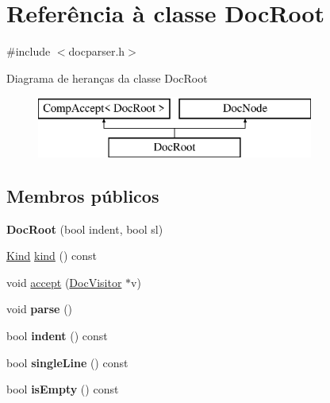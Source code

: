 \hypertarget{class_doc_root}{\section{Referência à classe Doc\-Root}
\label{class_doc_root}
}


{\ttfamily \#include $<$docparser.\-h$>$}

Diagrama de heranças da classe Doc\-Root\begin{figure}[H]
\begin{center}
\leavevmode
\includegraphics[height=2.000000cm]{class_doc_root}
\end{center}
\end{figure}
\subsection*{Membros públicos}
\begin{DoxyCompactItemize}
\item 
\hypertarget{class_doc_root_a8f85d5fa2b23cfee46deddde18a637c7}{{\bfseries Doc\-Root} (bool indent, bool sl)}\label{class_doc_root_a8f85d5fa2b23cfee46deddde18a637c7}

\item 
\hyperlink{class_doc_node_aa10c9e8951b8ccf714a59ec321bdac5b}{Kind} \hyperlink{class_doc_root_aa9d037bed9f9a083d0cd01485637d843}{kind} () const 
\item 
void \hyperlink{class_doc_root_a7ba716e854ae2f8f87a4eb2140e302b6}{accept} (\hyperlink{class_doc_visitor}{Doc\-Visitor} $\ast$v)
\item 
\hypertarget{class_doc_root_ad7c704b34912678d95c13243cacf9d7f}{void {\bfseries parse} ()}\label{class_doc_root_ad7c704b34912678d95c13243cacf9d7f}

\item 
\hypertarget{class_doc_root_a5cfe68974358924752bf7e7f5a687570}{bool {\bfseries indent} () const }\label{class_doc_root_a5cfe68974358924752bf7e7f5a687570}

\item 
\hypertarget{class_doc_root_aea7a99477670fd5f6d7a438ce5afe39a}{bool {\bfseries single\-Line} () const }\label{class_doc_root_aea7a99477670fd5f6d7a438ce5afe39a}

\item 
\hypertarget{class_doc_root_a479432127ee77145cc19d6a2d1590821}{bool {\bfseries is\-Empty} () const }\label{class_doc_root_a479432127ee77145cc19d6a2d1590821}

\end{DoxyCompactItemize}
